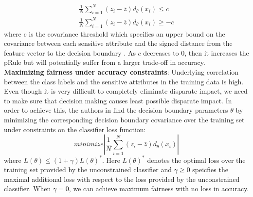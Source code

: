\documentclass[runningheads]{llncs}
\begin{document}
\begin{equation}
\begin{split}
\frac{1}{N}\sum_{i=1}^N(z_i - \bar{z})d_\theta(x_i) \leq c \\
\frac{1}{N}\sum_{i=1}^N(z_i - \bar{z})d_\theta(x_i) \geq -c
\end{split}
\end{equation}
where c is the covariance threshold which specifies an upper bound on the covariance between each sensitive attribute and the signed distance from the feature vector to the decision boundary \cite{zafar2015fairness}. As $c$ decreases to 0, then it increases the pRule but will potentially suffer from a larger trade-off in accuracy.\\
\textbf{Maximizing fairness under accuracy constraints}: Underlying correlation between the class labels and the sensitive attributes in the training data is high. Even though it is very difficult to completely eliminate disparate impact, we need to make sure that decision making causes least possible disparate impact. In order to achieve this, the authors in \cite{zafar2015fairness} find the decision boundary parameters $\theta$ by minimizing the corresponding decision boundary covariance over the training set under constraints on the classifier loss function:
\begin{equation}
minimize |\frac{1}{N}\sum_{i=1}^N(z_i - \bar{z})d_\theta(x_i)|
\end{equation}
where $L(\theta)\leq(1+\gamma)L(\theta)^*$. Here $L(\theta)^*$ denotes the optimal loss over the training set provided by the unconstrained classifier and $\gamma \geq 0$ speicfies the maximal additional loss with respect to the loss provided by the unconstrained classifier. When $\gamma = 0$, we can achieve maximum fairness with no loss in accuracy.
\end{document}
